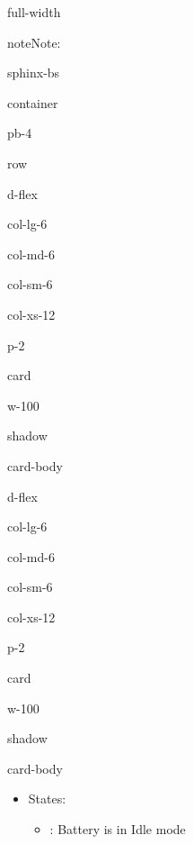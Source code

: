 \documentclass[letterpaper,10pt,english]{jupyterBook}
\begin{document}
\begin{sphinxuseclass}{full-width}
\begin{sphinxadmonition}{note}{Note:}
\sphinxAtStartPar
{}

\begin{sphinxuseclass}{sphinx-bs}
\begin{sphinxuseclass}{container}
\begin{sphinxuseclass}{pb-4}
\begin{sphinxuseclass}{row}
\begin{sphinxuseclass}{d-flex}
\begin{sphinxuseclass}{col-lg-6}
\begin{sphinxuseclass}{col-md-6}
\begin{sphinxuseclass}{col-sm-6}
\begin{sphinxuseclass}{col-xs-12}
\begin{sphinxuseclass}{p-2}
\begin{sphinxuseclass}{card}
\begin{sphinxuseclass}{w-100}
\begin{sphinxuseclass}{shadow}
\begin{sphinxuseclass}{card-body}
\sphinxAtStartPar
{}

\end{sphinxuseclass}
\end{sphinxuseclass}
\end{sphinxuseclass}
\end{sphinxuseclass}
\end{sphinxuseclass}
\end{sphinxuseclass}
\end{sphinxuseclass}
\end{sphinxuseclass}
\end{sphinxuseclass}
\end{sphinxuseclass}
\begin{sphinxuseclass}{d-flex}
\begin{sphinxuseclass}{col-lg-6}
\begin{sphinxuseclass}{col-md-6}
\begin{sphinxuseclass}{col-sm-6}
\begin{sphinxuseclass}{col-xs-12}
\begin{sphinxuseclass}{p-2}
\begin{sphinxuseclass}{card}
\begin{sphinxuseclass}{w-100}
\begin{sphinxuseclass}{shadow}
\begin{sphinxuseclass}{card-body}\begin{itemize}
\item {} 
\sphinxAtStartPar
States:
\begin{itemize}
\item {} 
\sphinxAtStartPar
{}: Battery is in Idle mode


\end{itemize}
\end{itemize}
\end{sphinxuseclass}
\end{sphinxuseclass}
\end{sphinxuseclass}
\end{sphinxuseclass}
\end{sphinxuseclass}
\end{sphinxuseclass}
\end{sphinxuseclass}
\end{sphinxuseclass}
\end{sphinxuseclass}
\end{sphinxuseclass}
\end{sphinxuseclass}
\end{sphinxuseclass}
\end{sphinxuseclass}
\end{sphinxuseclass}
\end{sphinxadmonition}
\end{sphinxuseclass}
\end{document}

